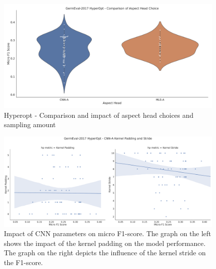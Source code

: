 \begin{figure}
	\centering
	\includegraphics[width=\textwidth]{figures/06_results/06_hp_ge_vio_aspectHead_test}
	\caption{Hyperopt - Comparison and impact of aspect head choices and sampling amount}
	\label{fig:06_ge_aspectHeadChoices}
\end{figure}

\begin{figure}
	\centering
	\includegraphics[width=\textwidth]{figures/06_results/06_hp_ge_lm_cnnParams2_test}
	\caption{Impact of CNN parameters on micro F1-score. The graph on the left shows the impact of the kernel padding on the model performance. The graph on the right depicts the influence of the kernel stride on the F1-score.}
	\label{fig:06_HpOptim_CnnParams2}
\end{figure}

